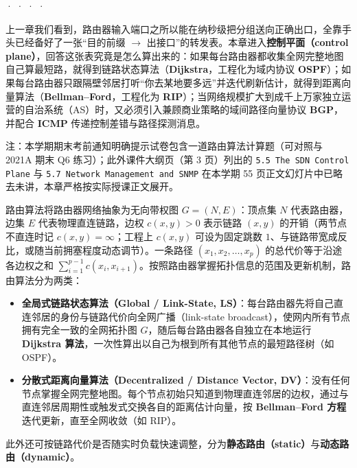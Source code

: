 

 ·  ·  ·  · 


上一章我们看到，路由器输入端口之所以能在纳秒级把分组送向正确出口，全靠手头已经备好了一张“目的前缀 $\to$ 出接口”的转发表。本章进入\textbf{控制平面（control plane）}，回答这张表究竟是怎么算出来的：如果每台路由器都收集全网完整地图自己算最短路，就得到链路状态算法（\textbf{Dijkstra}，工程化为域内协议 \textbf{OSPF}）；如果每台路由器只跟隔壁邻居打听“你去某地要多远”并迭代刷新估计，就得到距离向量算法（\textbf{Bellman–Ford}，工程化为 \textbf{RIP}）；当网络规模扩大到成千上万家独立运营的自治系统（AS）时，又必须引入兼顾商业策略的域间路径向量协议 \textbf{BGP}，并配合 \textbf{ICMP} 传递控制差错与路径探测消息。

注：本学期期末考前通知明确提示试卷包含一道路由算法计算题（可对照与 2021A 期末 Q6 练习）；此外课件大纲页（第 3 页）列出的 \texttt{5.5 The SDN Control Plane} 与 \texttt{5.7 Network Management and SNMP} 在本学期 55 页正文幻灯片中已略去未讲，本章严格按实际授课正文展开。



路由算法将路由器网络抽象为无向带权图 $G = (N, E)$：顶点集 $N$ 代表路由器，边集 $E$ 代表物理直连链路，边权 $c(x, y) > 0$ 表示链路 $(x, y)$ 的开销（两节点不直连时记 $c(x, y) = \infty$；工程上 $c(x,y)$ 可设为固定跳数 $1$、与链路带宽成反比，或随当前拥塞程度动态调节）。一条路径 $(x_1, x_2, \dots, x_p)$ 的总代价等于沿途各边权之和 $\sum_{i=1}^{p-1} c(x_i, x_{i+1})$。按照路由器掌握拓扑信息的范围及更新机制，路由算法分为两类：
\begin{itemize}
\item \textbf{全局式链路状态算法（Global / Link-State, LS）}：每台路由器先将自己直连邻居的身份与链路代价向全网广播（link-state broadcast），使网内所有节点拥有完全一致的全网拓扑图 $G$，随后每台路由器各自独立在本地运行 \textbf{Dijkstra 算法}，一次性算出以自己为根到所有其他节点的最短路径树（如 OSPF）。
\item \textbf{分散式距离向量算法（Decentralized / Distance Vector, DV）}：没有任何节点掌握全网完整地图。每个节点初始只知道到物理直连邻居的边权，通过与直连邻居周期性或触发式交换各自的距离估计向量，按 \textbf{Bellman–Ford 方程}迭代更新，直至全网收敛（如 RIP）。
\end{itemize}
此外还可按链路代价是否随实时负载快速调整，分为\textbf{静态路由（static）}与\textbf{动态路由（dynamic）}。


